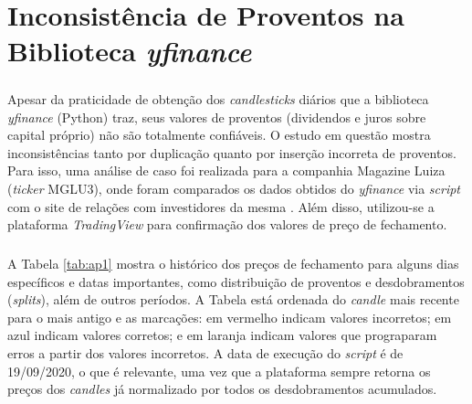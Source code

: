 \chapter{Inconsistência de Proventos na Biblioteca \textit{yfinance}}
\label{ApendiceA}

\paragraph{} Apesar da praticidade de obtenção dos \textit{candlesticks} diários que a biblioteca \textit{yfinance} (Python) traz, seus valores de proventos (dividendos e juros sobre capital próprio) não são totalmente confiáveis. O estudo em questão mostra inconsistências tanto por duplicação quanto por inserção incorreta de proventos. Para isso, uma análise de caso foi realizada para a companhia Magazine Luiza (\textit{ticker} MGLU3), onde foram comparados os dados obtidos do \textit{yfinance} via \textit{script} com o site de relações com investidores da mesma \cite{mglu_ri}. Além disso, utilizou-se a plataforma \textit{TradingView} \cite{tradingview} para confirmação dos valores de preço de fechamento.

\paragraph{} A Tabela \ref{tab:ap1} mostra o histórico dos preços de fechamento para alguns dias específicos e datas importantes, como distribuição de proventos e desdobramentos (\textit{splits}), além de outros períodos. A Tabela está ordenada do \textit{candle} mais recente para o mais antigo e as marcações: em vermelho indicam valores incorretos; em azul indicam valores corretos; e em laranja indicam valores que prograparam erros a partir dos valores incorretos. A data de execução do \textit{script} é de 19/09/2020, o que é relevante, uma vez que a plataforma sempre retorna os preços dos \textit{candles} já normalizado por todos os desdobramentos acumulados.


